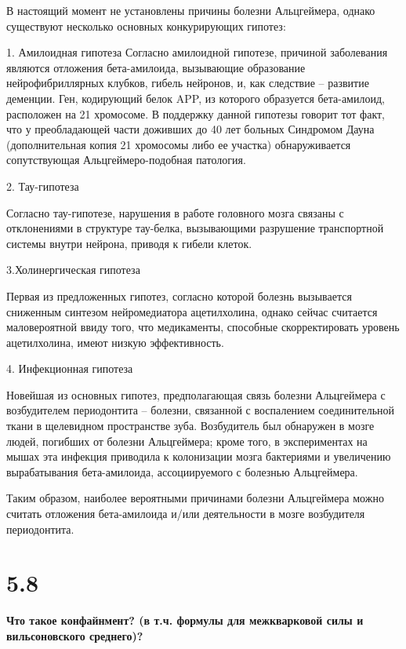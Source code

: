 \documentclass[a4paper,14pt]{article}
\begin{document}
В настоящий момент не установлены причины болезни Альцгеймера, однако существуют несколько основных конкурирующих гипотез:

1. Амилоидная гипотеза Согласно амилоидной гипотезе, причиной заболевания являются отложения бета-амилоида, вызывающие образование нейрофибриллярных клубков, гибель нейронов, и, как следствие – развитие деменции. Ген, кодирующий белок APP, из которого образуется бета-амилоид, расположен на 21 хромосоме. В поддержку данной гипотезы говорит тот факт, что у преобладающей части доживших до 40 лет больных Синдромом Дауна (дополнительная копия 21 хромосомы либо ее участка) обнаруживается сопутствующая Альцгеймеро-подобная патология.

2. Тау-гипотеза

Согласно тау-гипотезе, нарушения в работе головного мозга связаны с отклонениями в структуре тау-белка, вызывающими разрушение транспортной системы внутри нейрона, приводя к гибели клеток.

3.Холинергическая гипотеза

Первая из предложенных гипотез, согласно которой болезнь вызывается сниженным синтезом нейромедиатора ацетилхолина, однако сейчас считается маловероятной ввиду того, что медикаменты, способные скорректировать уровень ацетилхолина, имеют низкую эффективность.

4. Инфекционная гипотеза

Новейшая из основных гипотез, предполагающая связь болезни Альцгеймера с возбудителем периодонтита – болезни, связанной с воспалением соединительной ткани в щелевидном пространстве зуба. Возбудитель был обнаружен в мозге людей, погибших от болезни Альцгеймера; кроме того, в экспериментах на мышах эта инфекция приводила к колонизации мозга бактериями и увеличению вырабатывания бета-амилоида, ассоциируемого с болезнью Альцгеймера.

Таким образом, наиболее вероятными причинами болезни Альцгеймера можно считать отложения бета-амилоида и/или деятельности в мозге возбудителя периодонтита.

\section*{5.8}

\begin{center}
	\LARGE{\textbf{Что такое конфайнмент? (в т.ч. формулы для межкварковой силы и вильсоновского среднего)?}}\\
\end{center}
\end{document}
